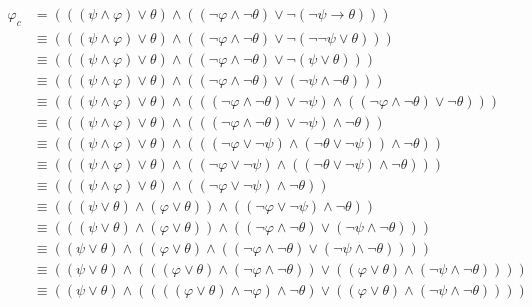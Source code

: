 \documentclass[12pt,a4paper]{scrartcl}
\begin{document}
\begin{align}
  \varphi_c 
    & = (((\psi \wedge \varphi) \vee \theta) \wedge ((\neg \varphi \wedge \neg \theta) \vee \neg(\neg \psi \rightarrow \theta))) \\
    & \equiv (((\psi \wedge \varphi) \vee \theta) \wedge ((\neg \varphi \wedge \neg \theta) \vee \neg(\neg \neg \psi \vee \theta))) \\
    & \equiv (((\psi \wedge \varphi) \vee \theta) \wedge ((\neg \varphi \wedge \neg \theta) \vee \neg(\psi \vee \theta))) \\
    & \equiv (((\psi \wedge \varphi) \vee \theta) \wedge ((\neg \varphi \wedge \neg \theta) \vee (\neg \psi \wedge \neg \theta))) \\
    & \equiv (((\psi \wedge \varphi) \vee \theta) \wedge (((\neg \varphi \wedge \neg \theta) \vee \neg \psi) \wedge ((\neg \varphi \wedge \neg \theta) \vee \neg \theta))) \\
    & \equiv (((\psi \wedge \varphi) \vee \theta) \wedge (((\neg \varphi \wedge \neg \theta) \vee \neg \psi) \wedge \neg \theta)) \\
    & \equiv (((\psi \wedge \varphi) \vee \theta) \wedge (((\neg \varphi \vee \neg \psi) \wedge (\neg \theta \vee \neg \psi)) \wedge \neg \theta)) \\
    & \equiv (((\psi \wedge \varphi) \vee \theta) \wedge ((\neg \varphi \vee \neg \psi) \wedge ((\neg \theta \vee \neg \psi) \wedge \neg \theta))) \\
    & \equiv (((\psi \wedge \varphi) \vee \theta) \wedge ((\neg \varphi \vee \neg \psi) \wedge \neg \theta)) \\
    & \equiv (((\psi \vee \theta) \wedge (\varphi \vee \theta)) \wedge ((\neg \varphi \vee \neg \psi) \wedge \neg \theta)) \\
    & \equiv (((\psi \vee \theta) \wedge (\varphi \vee \theta)) \wedge ((\neg \varphi \wedge \neg \theta) \vee (\neg \psi \wedge \neg \theta))) \\
    & \equiv ((\psi \vee \theta) \wedge ((\varphi \vee \theta) \wedge ((\neg \varphi \wedge \neg \theta) \vee (\neg \psi \wedge \neg \theta)))) \\
    & \equiv ((\psi \vee \theta) \wedge (((\varphi \vee \theta) \wedge (\neg \varphi \wedge \neg \theta)) \vee ((\varphi \vee \theta) \wedge (\neg \psi \wedge \neg \theta)))) \\
    & \equiv ((\psi \vee \theta) \wedge ((((\varphi \vee \theta) \wedge \neg \varphi) \wedge \neg \theta) \vee ((\varphi \vee \theta) \wedge (\neg \psi \wedge \neg \theta)))) \\

\end{align}
\end{document}
